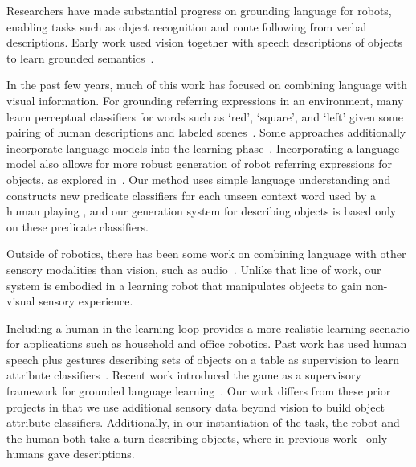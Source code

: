 Researchers have made substantial progress on grounding language for robots, enabling tasks such as object recognition and route following from verbal descriptions.
Early work used vision together with speech descriptions of objects to learn grounded semantics~\cite{roy:cogsci02}.

In the past few years, much of this work has focused on combining language with visual information.
For grounding referring expressions in an environment, many learn perceptual classifiers for words such as `red', `square', and `left' given some pairing of human descriptions and labeled scenes~\cite{liu:acl14,malinowski:nips14,mohan:acs13,sun:icra13,dindo:iros10,vogel:aaai10}.
Some approaches additionally incorporate language models into the learning phase~\cite{spranger:ijcai15,krishnamurthy:acl13,perera:aaai13,matuszek:icml12}.
Incorporating a language model also allows for more robust generation of robot referring expressions for objects, as explored in~\cite{tellex:rss14}. Our method uses simple language understanding and constructs new predicate classifiers for each unseen context word used by a human playing \ispy, and our generation system for describing objects is based only on these predicate classifiers.

Outside of robotics, there has been some work on combining language with other sensory modalities than vision, such as audio~\cite{kiela:emnlp15}.
Unlike that line of work, our system is embodied in a learning robot that manipulates objects to gain non-visual sensory experience.

Including a human in the learning loop provides a more realistic learning scenario for applications such as household and office robotics.
Past work has used human speech plus gestures describing sets of objects on a table as supervision to learn attribute classifiers~\cite{matuszek:aaai14,kollar:rss13}. Recent work introduced the \ispy game as a supervisory framework for grounded language learning~\cite{parde:ijcai15}.
Our work differs from these prior projects in that we use additional sensory data beyond vision to build object attribute classifiers. Additionally, in our instantiation of the \ispy task, the robot and the human both take a turn describing objects, where in previous work~\cite{parde:ijcai15} only humans gave descriptions.